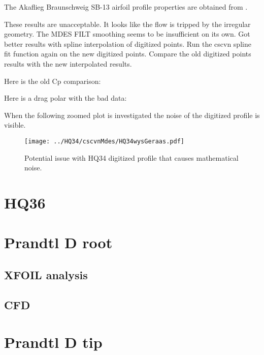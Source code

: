 \documentclass{article}
\begin{document}
The Akaflieg Braunschweig SB-13 airfoil profile properties are obtained from \cite{SB13Aerodynamics}.


These results are unacceptable.  It looks like the flow is tripped by the irregular geometry.  The MDES FILT smoothing seems to be insufficient on its own.  Got better results with spline interpolation of digitized points.
Run the cscvn spline fit function again on the new digitized points.  Compare the old digitized points results with the new interpolated results.


Here is the old Cp comparison:



Here is a drag polar with the bad data:


When the following zoomed plot is investigated the noise of the digitized profile is visible.

\begin{figure}[H]
\centering
\texttt{[image: ../HQ34/cscvnMdes/HQ34wysGeraas.pdf]}
\caption{Potential issue with HQ34 digitized profile that causes mathematical noise.}
\end{figure}

\section{HQ36}


\section{Prandtl D root}

\subsection{XFOIL analysis}

\subsection{CFD}

\section{Prandtl D tip}





\end{document}
